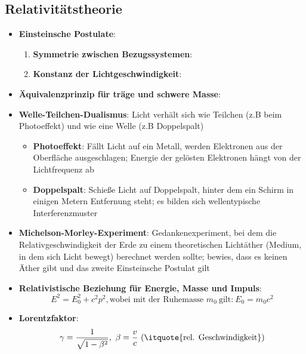 \subsection{Relativitätstheorie}%
\label{mech:sub:relativitaetstheorie}

\begin{itemize}
	\item \textbf{Einsteinsche Postulate}:
	\begin{enumerate}
		\item \textbf{Symmetrie zwischen Bezugssystemen}: 
		\item \textbf{Konstanz der Lichtgeschwindigkeit}: 
	\end{enumerate}
	\item \textbf{Äquivalenzprinzip für träge und schwere Masse}: 
	\item \textbf{Welle-Teilchen-Dualismus}: Licht verhält sich wie Teilchen (z.B beim Photoeffekt) und wie eine Welle (z.B Doppelspalt)
	\begin{itemize}
		\item \textbf{Photoeffekt}: Fällt Licht auf ein Metall, werden Elektronen aus der Oberfläche ausgeschlagen; Energie der gelösten Elektronen hängt von der Lichtfrequenz ab
		\item \textbf{Doppelspalt}: Schieße Licht auf Doppelspalt, hinter dem ein Schirm in einigen Metern Entfernung steht; es bilden sich wellentypische Interferenzmuster
	\end{itemize}
	\item \textbf{Michelson-Morley-Experiment}: Gedankenexperiment, bei dem die Relativgeschwindigkeit der Erde zu einem theoretischen Lichtäther (Medium, in dem sich Licht bewegt) berechnet werden sollte; bewies, dass es keinen Äther gibt und das zweite Einsteinsche Postulat gilt
	\item \textbf{Relativistische Beziehung für Energie, Masse und Impuls}:
	\begin{equation}
		E^2 = E_0^2 + c^2p^2,\text{wobei mit der Ruhemasse } m_0\ \text{gilt:}\ E_0 = m_0c^2
	\end{equation}
	\item \textbf{Lorentzfaktor}:
	\begin{equation}
		\gamma = \frac{1}{\sqrt{1 - \beta^2}},\ \beta = \frac{v}{c}\ (\text{\itquote{rel. Geschwindigkeit}})

\end{equation}
\end{itemize}
